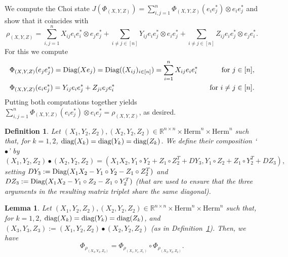 \documentclass[11pt]{article}
\makeatletter
\newcommand{\R}{\ensuremath{\mathbb{R}}}   %
\newcommand{\Herm}{\mathrm{Herm}}
\newcommand{\diag}{\text{\rm diag}}
\newcommand{\Diag}{\text{\rm Diag}}
\newcommand{\ot}{\otimes}
\theoremstyle{plain}
\newtheorem{lemma}[satz]{Lemma}
\newtheorem{definition}[satz]{Definition}
\renewenvironment{proof}[1][\proofname]{%
  \par
  \pushQED{}%
  \normalfont
  \topsep6\p@\@plus6\p@
  \trivlist
  \item[\hskip\labelsep\itshape #1\@addpunct{.}]%
}{%
  \popQED
  \endtrivlist
}
\makeatother
\begin{document}
\begin{proof}
    We compute the Choi state $J(\Phi_{(X,Y,Z)})=\sum_{i,j=1}^n\Phi_{(X,Y,Z)}(e_i e_j^*)\ot e_ie_j^*$ and show that it coincides with $$\rho_{(X,Y,Z)} =\sum_{i,j=1}^n X_{ij} e_ie_i^*\ot e_je_j^* +\sum_{i\ne j\in [n]} Y_{ij} e_ie_j^*\ot e_ie_j^*+\sum_{i\ne j\in [n]} Z_{ij} e_ie_j^* \ot e_je_i^*.$$
    For this we compute 
    \begin{align*}
   & \Phi_{(X,Y,Z)}(e_j e_j^*) = \Diag(Xe_j) = \Diag((X_{ij})_{i\in[n]}) = \sum_{i=1}^nX_{ij}e_ie_i^* \ &\text{ for } j\in [n],\\
  &\Phi_{(X,Y,Z)}(e_i e_j^*)=Y_{ij}e_ie_j^* + Z_{ji}e_je_i^* \ & \text{ for } i\ne j\in [n].
  \end{align*}
    Putting both computations together yields $\sum_{i,j=1}^n\Phi_{(X,Y,Z)}(e_i e_j^*)\ot e_ie_j^*=\rho_{(X,Y,Z)}$, as desired.
\end{proof}

\begin{definition}\label{def:DOC123}
    Let $(X_1,Y_2,Z_2),(X_2,Y_2,Z_2)\in\R^{n\times n}\times\Herm^n\times\Herm^n$ such that, for $k=1,2$,  $\diag(X_k)=\diag(Y_k)=\diag(Z_k)$.
    We define their composition `$\bullet$' by
    $$(X_1,Y_2,Z_2)\bullet(X_2,Y_2,Z_2)=(X_1X_2,Y_1\circ Y_2+Z_1\circ Z_2^T+DY_3,Y_1\circ Z_2+Z_1\circ Y_2^T+DZ_3),$$
   setting $DY_3:=\Diag(X_1X_2-Y_1\circ Y_2-Z_1\circ Z_2^T)$ and $DZ_3:=\Diag(X_1X_2-Y_1\circ Z_2-Z_1\circ Y_2^T)$ (that are used to ensure that the three arguments in the resulting matrix triplet share the same diagonal).
\end{definition}


\begin{lemma}\label{lem:Phi123}
    Let $(X_1,Y_2,Z_2),(X_2,Y_2,Z_2)\in\R^{n\times n}\times\Herm^n\times\Herm^n$ such that, for $k=1,2$, $\diag(X_k)=\diag(Y_k)=\diag(Z_k)$, and  $(X_3,Y_3,Z_3):=(X_1,Y_2,Z_2)\bullet(X_2,Y_2,Z_2)$ (as in Definition~\ref{def:DOC123}). Then,  we have
       $$\Phi_{\rho_{(X_3,Y_3,Z_3)}} = \Phi_{\rho_{(X_1,Y_1,Z_1)}}\circ\Phi_{\rho_{(X_2,Y_2,Z_2)}}.$$
\end{lemma}
\end{document}
